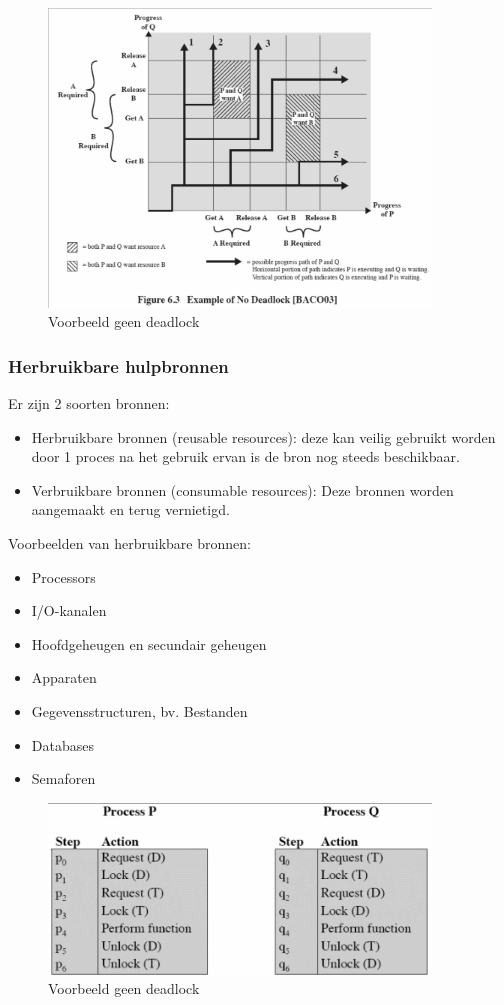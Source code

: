 \begin{figure}[htp]
    \centering
            \includegraphics[width=4in]{img/nodeadlock.png}
        \caption{Voorbeeld geen deadlock}
    \label{fig:Voorbeeld geen deadlock}
\end{figure}


\subsubsection{Herbruikbare hulpbronnen}

Er zijn 2 soorten bronnen:

\begin{itemize}
\item Herbruikbare bronnen (reusable resources): deze kan veilig gebruikt worden door 1 proces na het gebruik ervan is de bron nog steeds beschikbaar.
\item Verbruikbare bronnen (consumable resources): Deze bronnen worden aangemaakt en terug vernietigd.
\end{itemize}

Voorbeelden van herbruikbare bronnen:

\begin{itemize}
\item Processors
\item I/O-kanalen
\item Hoofdgeheugen en secundair geheugen
\item Apparaten
\item Gegevensstructuren, bv. Bestanden
\item Databases
\item Semaforen
\end{itemize}

\begin{figure}[htp]
    \centering
            \includegraphics[width=4in]{img/processenherbruikbaar.png}
        \caption{Voorbeeld geen deadlock}
    \label{fig:Voorbeeld geen deadlock}
\end{figure}


